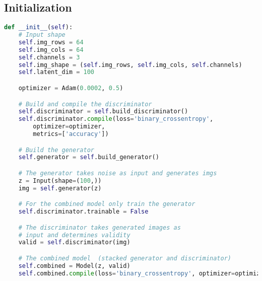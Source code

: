 \subsection{Initialization} %
\label{subsec:initialization}
\begin{lstlisting}[basicstyle=\scriptsize,language=Python]
def __init__(self):
    # Input shape
    self.img_rows = 64
    self.img_cols = 64
    self.channels = 3
    self.img_shape = (self.img_rows, self.img_cols, self.channels)
    self.latent_dim = 100

    optimizer = Adam(0.0002, 0.5)

    # Build and compile the discriminator
    self.discriminator = self.build_discriminator()
    self.discriminator.compile(loss='binary_crossentropy',
        optimizer=optimizer,
        metrics=['accuracy'])

    # Build the generator
    self.generator = self.build_generator()

    # The generator takes noise as input and generates imgs
    z = Input(shape=(100,))
    img = self.generator(z)

    # For the combined model only train the generator
    self.discriminator.trainable = False

    # The discriminator takes generated images as 
    # input and determines validity
    valid = self.discriminator(img)

    # The combined model  (stacked generator and discriminator)
    self.combined = Model(z, valid)
    self.combined.compile(loss='binary_crossentropy', optimizer=optimizer)
\end{lstlisting}
\par\bigskip


